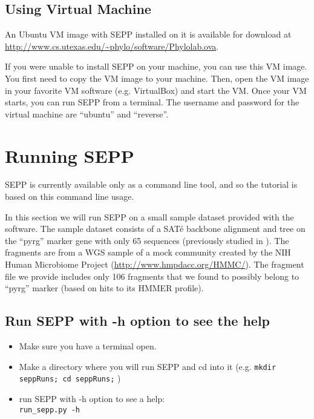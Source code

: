 \documentclass[11pt]{article} %
\newcommand{\sepp}{SEPP\xspace}
\newcommand{\ins}[1]{{\tt #1}}
\newcommand{\sate}{SAT\'{e}\xspace}
\begin{document}
\subsection{Using Virtual Machine}
An Ubuntu VM image with \sepp installed on it is available for download at \url{http://www.cs.utexas.edu/~phylo/software/Phylolab.ova}.  

If you were unable to install \sepp on your machine, you can use this VM image. You first need to copy the VM image to your machine. Then, open the VM image in your favorite VM software (e.g. VirtualBox) and start the VM. Once your VM starts, you can run \sepp from a terminal. The username and password for the virtual machine are ``ubuntu'' and ``reverse''.

\section{Running \sepp}
\sepp is currently available only as a command line tool, and
so the tutorial is based on this command line usage.

In this section we will run \sepp on a small sample dataset provided with the software. 
The sample dataset consists of a \sate backbone alignment and tree on the ``pyrg'' marker gene with only 65 sequences
(previously studied in \cite{metaphyler}). 
The fragments are from a WGS sample of a mock community created by the NIH Human Microbiome Project (\url{http://www.hmpdacc.org/HMMC/}).
The fragment file we provide includes only 106 fragments that we found to possibly belong to ``pyrg'' marker (based on hits to its HMMER profile).



\subsection{Run \sepp with -h option to see the help }

\begin{itemize}
\item Make sure you have a terminal open.
\item Make a directory where you will run \sepp and cd into it (e.g. \ins{mkdir seppRuns; cd seppRuns;} )
\item run \sepp with -h option to see a help:\\

\ins{run\_sepp.py -h}
\end{itemize}
\end{document}
